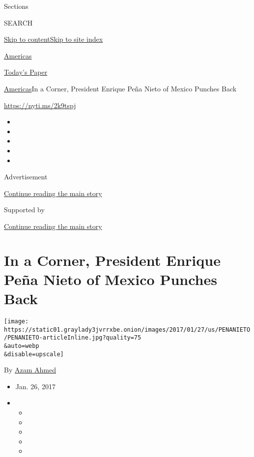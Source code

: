 Sections

SEARCH

\protect\hyperlink{site-content}{Skip to
content}\protect\hyperlink{site-index}{Skip to site index}

\href{https://www.nytimes3xbfgragh.onion/section/world/americas}{Americas}

\href{https://myaccount.nytimes3xbfgragh.onion/auth/login?response_type=cookie\&client_id=vi}{}

\href{https://www.nytimes3xbfgragh.onion/section/todayspaper}{Today's
Paper}

\href{/section/world/americas}{Americas}\textbar{}In a Corner, President
Enrique Peña Nieto of Mexico Punches Back

\url{https://nyti.ms/2k9tspj}

\begin{itemize}
\item
\item
\item
\item
\item
\end{itemize}

Advertisement

\protect\hyperlink{after-top}{Continue reading the main story}

Supported by

\protect\hyperlink{after-sponsor}{Continue reading the main story}

\hypertarget{in-a-corner-president-enrique-peuxf1a-nieto-of-mexico-punches-back}{%
\section{In a Corner, President Enrique Peña Nieto of Mexico Punches
Back}\label{in-a-corner-president-enrique-peuxf1a-nieto-of-mexico-punches-back}}

\texttt{[image: https://static01.graylady3jvrrxbe.onion/images/2017/01/27/us/PENANIETO/PENANIETO-articleInline.jpg?quality=75\\\&auto=webp\\\&disable=upscale]}

By \href{http://www.nytimes3xbfgragh.onion/by/azam-ahmed}{Azam Ahmed}

\begin{itemize}
\item
  Jan. 26, 2017
\item
  \begin{itemize}
  \item
  \item
  \item
  \item
  \item
  \end{itemize}
\end{itemize}

